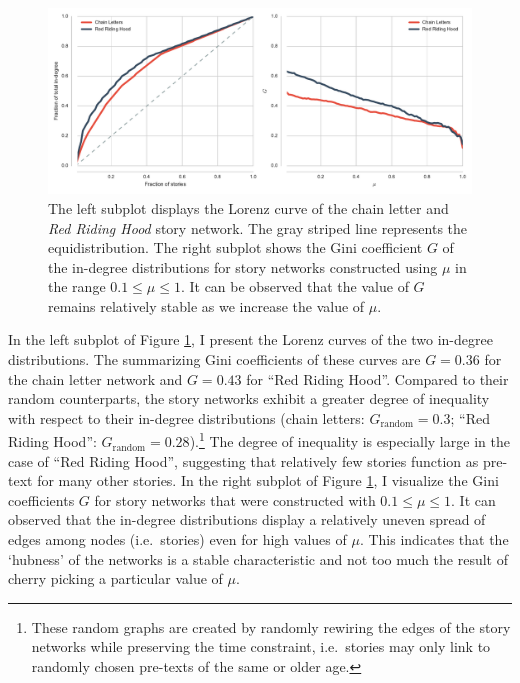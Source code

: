 \begin{figure}
\centering
\includegraphics[width=\textwidth]{images/gini-lorenz.pdf}
\caption{The left subplot displays the Lorenz curve of the chain letter and \emph{Red Riding Hood} story network. The gray striped line represents the equidistribution. The right subplot shows the Gini coefficient $G$ of the in-degree distributions for story networks constructed using $\mu$ in the range $0.1 \leq \mu \leq 1$. It can be observed that the value of $G$ remains relatively stable as we increase the value of $\mu$.}
\label{fig:degree-statistics}
\end{figure}

In the left subplot of Figure \ref{fig:degree-statistics}, I present the Lorenz curves of the two in-degree distributions. The summarizing Gini coefficients of these curves are $G=0.36$ for the chain letter network and $G=0.43$ for ``Red Riding Hood''. Compared to their random counterparts, the story networks exhibit a greater degree of inequality with respect to their in-degree distributions (chain letters: $G_{\text{random}}=0.3$; ``Red Riding Hood'': $G_{\text{random}}=0.28$).\footnote{These random graphs are created by randomly rewiring the edges of the story networks while preserving the time constraint, i.e.\ stories may only link to randomly chosen pre-texts of the same or older age.} The degree of inequality is especially large in the case of ``Red Riding Hood'', suggesting that relatively few stories function as pre-text for many other stories. In the right subplot of Figure \ref{fig:degree-statistics}, I visualize the Gini coefficients $G$ for story networks that were constructed with $0.1 \leq \mu \leq 1$. It can observed that the in-degree distributions display a relatively uneven spread of edges among nodes (i.e.~stories) even for high values of $\mu$. This indicates that the `hubness' of the networks is a stable characteristic and not too much the result of cherry picking a particular value of $\mu$. 


